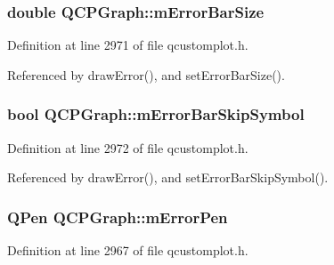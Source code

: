 \hypertarget{class_q_c_p_graph_a7b51c8d09510f9d195b5e765ccbcf05b}{}
\subsubsection[{m\+Error\+Bar\+Size}]{\setlength{\rightskip}{0pt plus 5cm}double Q\+C\+P\+Graph\+::m\+Error\+Bar\+Size\hspace{0.3cm}{\ttfamily [protected]}}\label{class_q_c_p_graph_a7b51c8d09510f9d195b5e765ccbcf05b}


Definition at line 2971 of file qcustomplot.\+h.



Referenced by draw\+Error(), and set\+Error\+Bar\+Size().

\hypertarget{class_q_c_p_graph_acf631d7dbd1055a69ab3b63094868557}{}
\subsubsection[{m\+Error\+Bar\+Skip\+Symbol}]{\setlength{\rightskip}{0pt plus 5cm}bool Q\+C\+P\+Graph\+::m\+Error\+Bar\+Skip\+Symbol\hspace{0.3cm}{\ttfamily [protected]}}\label{class_q_c_p_graph_acf631d7dbd1055a69ab3b63094868557}


Definition at line 2972 of file qcustomplot.\+h.



Referenced by draw\+Error(), and set\+Error\+Bar\+Skip\+Symbol().

\hypertarget{class_q_c_p_graph_aa35681a24165c2831301091a87b662ce}{}
\subsubsection[{m\+Error\+Pen}]{\setlength{\rightskip}{0pt plus 5cm}Q\+Pen Q\+C\+P\+Graph\+::m\+Error\+Pen\hspace{0.3cm}{\ttfamily [protected]}}\label{class_q_c_p_graph_aa35681a24165c2831301091a87b662ce}


Definition at line 2967 of file qcustomplot.\+h.



